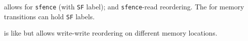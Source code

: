 
\hSep

  allows for \texttt{sfence} (with \texttt{SF} label);
and \texttt{sfence}-read reordering. The  for memory transitions
can hold \texttt{SF} labels.

\hSep

  is like  but allows write-write reordering
on different memory locations.

\hSep
